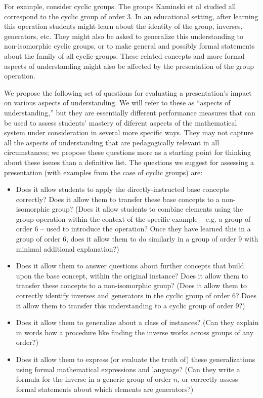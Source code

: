 \documentclass[man,mask,10pt]{apa6}
\begin{document}
For example, consider cyclic groups. The groups Kaminski et al studied all correspond to the cyclic group of order 3. In an educational setting, after learning this operation students might learn about the identity of the group, inverses, generators, etc. They might also be asked to generalize this understanding to non-isomorphic cyclic groups, or to make general and possibly formal statements about the family of all cyclic groups. These related concepts and more formal aspects of understanding might also be affected by the presentation of the group operation. \par
We propose the following set of questions for evaluating a presentation's impact on various aspects of understanding. We will refer to these as ``aspects of understanding,'' but they are essentially different performance measures that can be used to assess students' mastery of diferent aspects of the mathematical system under consideration in several more specific ways. They may not capture all the aspects of understanding that are pedagogically relevant in all circumstances; we propose these questions more as a starting point for thinking about these issues than a definitive list. The questions we suggest for assessing a presentation (with examples from the case of cyclic groups) are:
\begin{itemize}
\item Does it allow students to apply the directly-instructed base concepts correctly? Does it allow them to transfer these base concepts to a non-isomorphic group? (Does it allow students to combine elements using the group operation within the context of the specific example -- e.g. a group of order 6 -- used to introduce the operation? Once they have learned this in a group of order 6, does it allow them to do similarly in a group of order 9 with minimal additional explanation?) 
\item Does it allow them to answer questions about further concepts that build upon the base concept, within the original instance? Does it allow them to transfer these concepts to a non-isomorphic group? (Does it allow them to correctly identify inverses and generators in the cyclic group of order 6? Does it allow them to transfer this understanding to a cyclic group of order 9?)
\item Does it allow them to generalize about a class of instances? (Can they explain in words how a procedure like finding the inverse works across groups of any order?) 
\item Does it allow them to express (or evaluate the truth of) these generalizations using formal mathematical expressions and language? (Can they write a formula for the inverse in a generic group of order $n$, or correctly assess formal statements about which elements are generators?)
\end{itemize}
\end{document}
